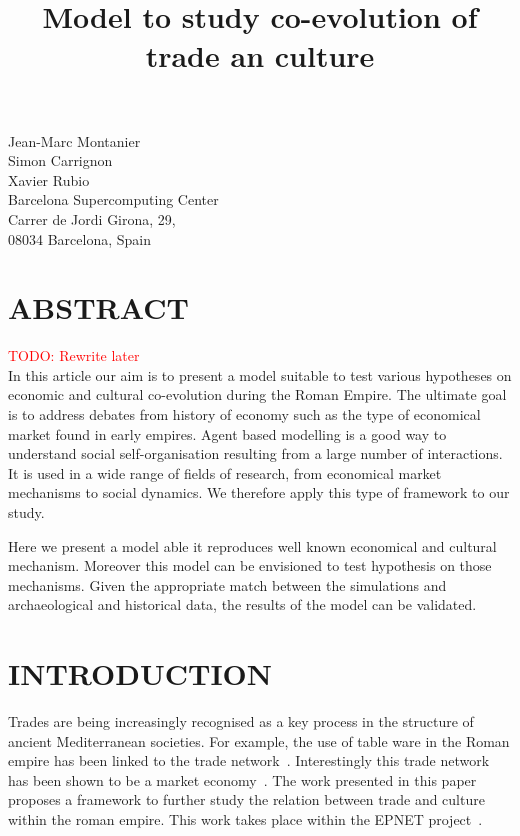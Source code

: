 \documentclass{wscpaperproc}
\newcommand{\memo}[2]{\textcolor{#1}{#2}}
\newcommand{\todo}[1]{\memo{red}{TODO: #1\\}}
\begin{document}

\title{Model to study co-evolution of trade an culture}
\maketitle

\begin{figure*}[htb]
{
\centering
Jean-Marc Montanier\\
Simon Carrignon\\ 
Xavier Rubio\\
\vspace{12pt}
Barcelona Supercomputing Center\\
Carrer de Jordi Girona, 29, \\
08034 Barcelona, Spain\\
}
\end{figure*}







\section*{ABSTRACT}

\todo{Rewrite later}
In this article our aim is to present a model suitable to test various hypotheses on economic and cultural co-evolution during the Roman Empire. The ultimate goal is to address debates from history of economy such as the type of economical market found in early empires. Agent based modelling is a good way to understand social self-organisation resulting from a large number of interactions. It is used in a wide range of fields of research, from economical market mechanisms to social dynamics. We therefore apply this type of framework to our study.

Here we present a model able it reproduces well known economical and cultural mechanism. Moreover this model can be envisioned to test hypothesis on those mechanisms. Given the appropriate match between the simulations and archaeological and historical data, the results of the model can be validated.


\section{INTRODUCTION}

Trades are being increasingly recognised as a key process in the structure of ancient Mediterranean societies. For example, the use of table ware in the Roman empire  has been linked to the trade network~\cite{brughmans_connecting_2010}. Interestingly this trade network has been shown to be a market economy~\cite{temin_market_2001}. The work presented in this paper proposes a framework to further study the relation between trade and culture within the roman empire. This work takes place within the EPNET project~\cite{remesal_epnet_2014}.
\end{document}
